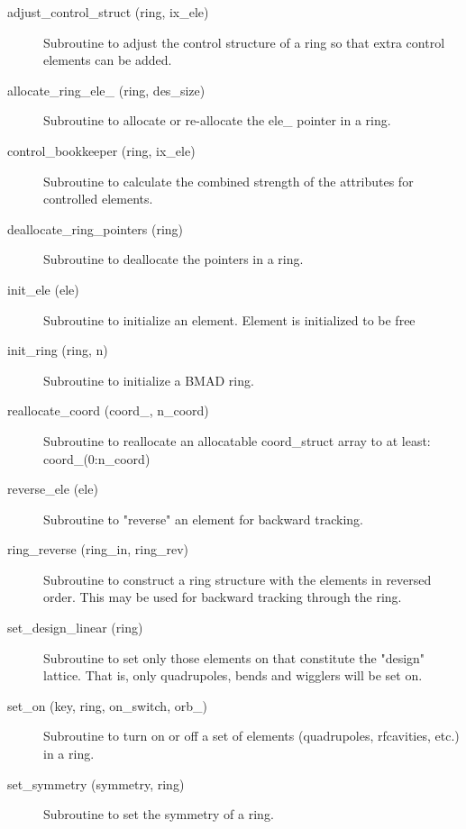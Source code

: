 \begin{description}

\item[adjust\_control\_struct (ring, ix\_ele)] \Newline
Subroutine to adjust the control structure of a ring so that 
extra control elements can be added. 

\item[allocate\_ring\_ele\_ (ring, des\_size)] \Newline 
     Subroutine to allocate or re-allocate the ele\_ pointer in a ring.

\item[control\_bookkeeper (ring, ix\_ele)] \Newline
Subroutine to calculate the combined strength of the attributes for controlled elements. 

\item[deallocate\_ring\_pointers (ring)] \Newline 
     Subroutine to deallocate the pointers in a ring.

\item[init\_ele (ele)] \Newline
Subroutine to initialize an element. Element is initialized to be free 

\item[init\_ring (ring, n)] \Newline 
     Subroutine to initialize a BMAD ring.

\item[reallocate\_coord (coord\_, n\_coord)] \Newline 
     Subroutine to reallocate an allocatable  coord\_struct array to at least:
         coord\_(0:n\_coord)

\item[reverse\_ele (ele)] \Newline
Subroutine to "reverse" an element for backward tracking. 

\item[ring\_reverse (ring\_in, ring\_rev)] \Newline
Subroutine to construct a ring structure with the elements in reversed order. This may be used for backward tracking through the ring. 

\item[set\_design\_linear (ring)] \Newline
Subroutine to set only those elements on that constitute the "design" lattice. That is, only quadrupoles, bends and wigglers will be set on. 

\item[set\_on (key, ring, on\_switch, orb\_)] \Newline
Subroutine to turn on or off a set of elements (quadrupoles, rfcavities, etc.) in a ring. 

\item[set\_symmetry (symmetry, ring)] \Newline
Subroutine to set the symmetry of a ring. 


\end{description}
